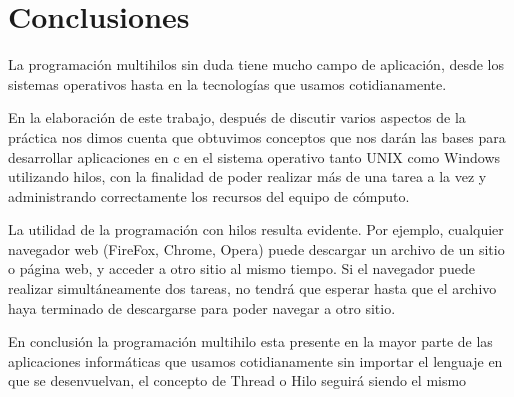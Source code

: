 \documentclass[12pt]{article}
\begin{document}
	\section{Conclusiones}
	La programación multihilos sin duda tiene mucho campo de aplicación, desde los sistemas operativos hasta en la tecnologías que usamos cotidianamente.
	
	En la elaboración de este trabajo, después de discutir varios aspectos de la práctica nos dimos cuenta que obtuvimos conceptos que nos darán las bases para desarrollar aplicaciones en c en el sistema operativo tanto UNIX como Windows utilizando hilos, con la finalidad de poder realizar más de una tarea a la vez y administrando correctamente los recursos del equipo de cómputo.
	
	La utilidad de la programación con hilos resulta evidente. Por ejemplo, cualquier navegador web (FireFox, Chrome, Opera) puede descargar un archivo de un sitio o página web, y acceder a otro sitio al mismo tiempo. Si el navegador puede realizar simultáneamente dos tareas, no tendrá que esperar hasta que el archivo haya terminado de descargarse para poder navegar a otro sitio.
	
	En conclusión la programación multihilo esta presente en la mayor parte de las aplicaciones informáticas que usamos cotidianamente sin importar el lenguaje en que se desenvuelvan, el concepto de Thread o Hilo seguirá siendo el mismo
\end{document}
